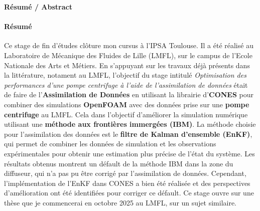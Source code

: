 \cleardoublepage

\large{\textbf{Résumé / Abstract}}

\vspace{0,5cm}

\paragraph{Résumé}

Ce stage de fin d'études clôture mon cursus à l'IPSA Toulouse.
Il a été réalisé au Laboratoire de Mécanique des Fluides de Lille (LMFL), sur le campus de l'Ecole Nationale des Arts et Métiers. En s'appuyant sur les travaux déjà présents dans la littérature, notament au LMFL, l'objectif du stage intitulé \textit{Optimisation des performances d'une pompe centrifuge à l'aide de l'assimilation de données} était de faire de l'\textbf{Assimilation de Données} en utilisant la librairie d'\textbf{CONES} pour combiner des simulations \textbf{OpenFOAM} avec des données prise sur une \textbf{pompe centrifuge} au LMFL. Cela dans l'objectif d'améliorer la simulation numérique utilisant une \textbf{méthode aux frontières immergées (IBM)}. La méthode choisie pour l'assimilation des données est le \textbf{filtre de Kalman d'ensemble (EnKF)}, qui permet de combiner les données de simulation et les observations expérimentales pour obtenir une estimation plus précise de l'état du système. Les résultats obtenus montrent un défault de la méthode IBM dans la zone du diffuseur, qui n'a pas pu être corrigé par l'assimilation de données. Cependant, l'implémentation de l'EnKF dans CONES a bien été réalisée et des perspectives d'amélioration ont été identifiées pour corriger ce défault.
Ce stage ouvre sur une thèse que je commencerai en octobre 2025 au LMFL, sur un sujet similaire.

